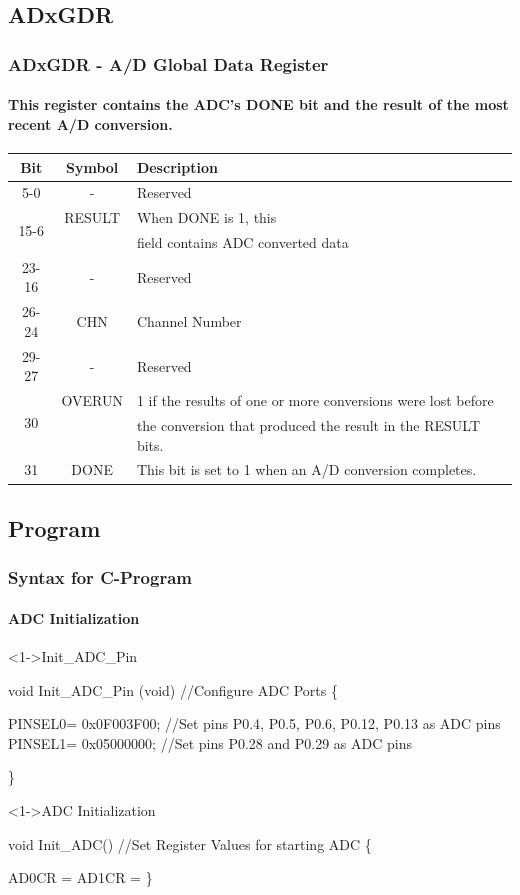 \documentclass[table,10pt,red]{beamer}
\begin{document}
\subsection{ADxGDR}
\begin{frame}
		\frametitle{ADxGDR - A/D Global Data Register} 
		\framesubtitle{This register contains the ADC's DONE bit and the result of the most recent A/D conversion.} 
			\begin{table}
				\small
			\begin{tabular}{|c|c|l|}
				\hline Bit & Symbol & Description \\ 
				\hline 5-0 & - & Reserved \\ 
				\hline \multirow{2}{*}{15-6}  & RESULT & When DONE is 1, this \\ 
											  &  & field contains ADC converted data \\ 
				\hline 23-16 & - & Reserved \\ 
				\hline 26-24 & CHN & Channel Number \\ 
				\hline 29-27 & - & Reserved \\ 
				\hline \multirow{2}{*}{30} & OVERUN & 1 if the results of one or more conversions were lost before\\
				                           &        & the conversion that produced the result in the RESULT bits. \\
				\hline 31 & DONE & This bit is set to 1 when an A/D conversion completes. \\ 
				\hline 
			\end{tabular}
			\end{table}
\end{frame}

\subsection{Program}
\begin{frame}[shrink = 4,fragile]
	\frametitle{Syntax for C-Program} \pause
	\framesubtitle{ADC Initialization}
		\begin{block}<1->{Init\_ADC\_Pin}	\pause
		\begin{semiverbatim}
				\scriptsize{
				void Init\_ADC\_Pin (void) \color{green} //Configure ADC Ports  \color{black}
				\{
					 
					PINSEL0= 0x0F003F00;  \color{red}//Set pins P0.4, P0.5, P0.6, P0.12, P0.13 as ADC pins\color{black}
					PINSEL1= 0x05000000;  \color{red}//Set pins P0.28 and P0.29 as ADC pins\color{black}
					 
				\} }
			\end{semiverbatim}
		\end{block} \pause
	
	\begin{block}<1->{ADC Initialization}	\pause
		\begin{semiverbatim}
				\scriptsize{
				void Init\_ADC()			\color{green} //Set Register Values for starting ADC  \color{black}
				\{
					 
  					AD0CR =
  					AD1CR =  
				\} }
			\end{semiverbatim}
		\end{block} \pause
\end{frame}
\end{document}
